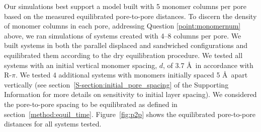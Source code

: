 \documentclass[journal=jpcbfk,manuscript=article]{achemso}
\begin{document}
%  
  
  Our simulations best support a model built with 5 monomer columns per pore based on
  the measured equilibrated pore-to-pore distances. To discern the density of
  monomer columns in each pore, addressing Question \ref{point:monomernum} above, we ran
  simulations of systems created with 4--8 columns per pore. We built systems in both
  the parallel displaced and sandwiched configurations and equilibrated them according
  to the dry equilibration procedure. We tested all systems with an initial vertical monomer 
  spacing, $\mathit{d}$, of 3.7 \AA~in accordance with R-$\pi$. We tested 4 additional 
  systems with monomers initially spaced 5 \AA~apart vertically (see section~\ref{S-section:initial_pore_spacing}
  of the Supporting Information for more details on sensitivity to initial layer spacing). 
  We considered the pore-to-pore spacing to be equilibrated as defined in section~\ref{method:equil_time}.
  Figure~\ref{fig:p2p} shows the equilibrated pore-to-pore distances for all systems tested. 
  
\end{document}
